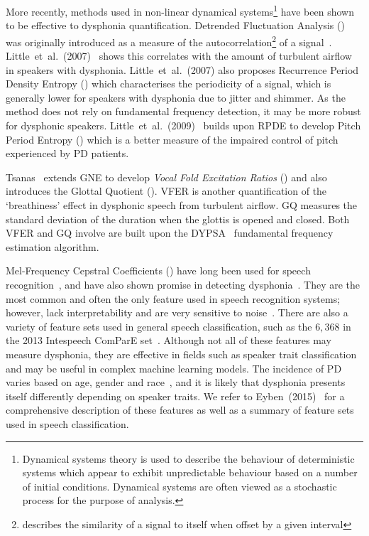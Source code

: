 \documentclass[12pt, twoside]{book}
\renewcommand\emph[1]{\textit{\color{USred}{#1}}}
\begin{document}
\label{dfadescription}
More recently, methods used in non-linear dynamical systems\footnote{Dynamical systems theory is used to describe the behaviour of deterministic systems which appear to exhibit unpredictable behaviour based on a number of initial conditions. Dynamical systems are often viewed as a stochastic process for the purpose of analysis.} have been shown to be effective to dysphonia quantification. Detrended Fluctuation Analysis (\emph{DFA}) was originally introduced as a measure of the autocorrelation\footnote{\emph{Autocorrelation} describes the similarity of a signal to itself when offset by a given interval} of a signal~\cite{dfa}. Little~et~al.~(2007)~\cite{splittlenonlinear2007} shows this correlates with the amount of turbulent airflow in speakers with dysphonia. Little~et~al.~(2007) also proposes Recurrence Period Density Entropy (\emph{RPDE}) which characterises the periodicity of a signal, which is generally lower for speakers with dysphonia due to jitter and shimmer. As the method does not rely on fundamental frequency detection, it may be more robust for dysphonic speakers. Little~et~al.~(2009)~\cite{splittledysphonia2009} builds upon RPDE to develop Pitch Period Entropy (\emph{PPE}) which is a better measure of the impaired control of pitch experienced by PD patients.

Tsanas~\cite{spoverview} extends GNE to develop \textit{Vocal Fold Excitation Ratios} (\emph{VFER}) and also introduces the Glottal Quotient (\emph{GQ}). VFER is another quantification of the `breathiness' effect in dysphonic speech from turbulent airflow. GQ measures the standard deviation of the duration when the glottis is opened and closed. Both VFER and GQ involve are built upon the DYPSA~\cite{dypsa} fundamental frequency estimation algorithm. 

Mel-Frequency Cepstral Coefficients (\emph{MFCC}) have long been used for speech recognition~\cite{mfcc}, and have also shown promise in detecting dysphonia~\cite{mfccml}. They are the most common and often the only feature used in speech recognition systems; however, lack interpretability and are very sensitive to noise~\cite{mfccrobust}. There are also a variety of feature sets used in general speech classification, such as the $6,368$ in the 2013 Intespeech ComParE set~\cite{is2013}. Although not all of these features may measure dysphonia, they are effective in fields such as speaker trait classification and may be useful in complex machine learning models. The incidence of PD varies based on age, gender and race~\cite{ageracial,racial}, and it is likely that dysphonia presents itself differently depending on speaker traits. We refer to Eyben~(2015)~\cite{ostextbook} for a comprehensive description of these features as well as a summary of feature sets used in speech classification.
\end{document}
